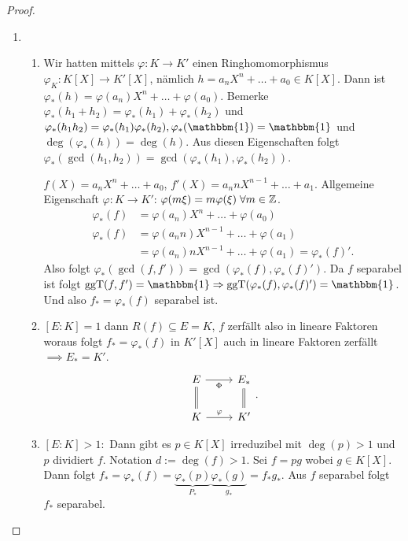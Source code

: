 \begin{proof}
	\begin{enumerate}
		\item \begin{enumerate}
			\item Wir hatten mittels $\varphi: K \to K'$ einen Ringhomomorphismus $\varphi_{K}: K[X] \to K'[X]$, nämlich
				$h = a_{n} X^{n} + \ldots + a_0 \in K[X]$.
				Dann ist $\varphi_{*}(h) = \varphi(a_{n}) X^{n} + \ldots + \varphi(a_0)$. Bemerke $\varphi_{*}(h_1 + h_2) = \varphi_{*}(h_1) + \varphi_{*}(h_2)$ und
				$\varphi_{*}(h_1 h_2) = \varphi_{*}(h_1)\varphi_{*}(h_2), \varphi_{*}(\mathbbm{1}) = \mathbbm{1}$ und $\deg(\varphi_{*}(h)) = \deg(h)$.
				Aus diesen Eigenschaften folgt $\varphi_{*}(\gcd(h_1, h_2)) = \gcd(\varphi_{*}(h_1), \varphi_{*}(h_2))$.

				$f(X) = a_{n} X^{n} + \ldots + a_0$, $f'(X) = a_{n} n X^{n-1} + \ldots + a_1$.
				Allgemeine Eigenschaft $\varphi: K \to K'$: $\varphi(m \xi) = m \varphi(\xi) \forall m \in \Z$.
				\begin{align*}
					\varphi_{*}(f) &= \varphi(a_{n}) X^{n} + \ldots + \varphi(a_0)\\
					\varphi_{*}(f) &= \varphi(a_{n} n) X^{n-1} + \ldots + \varphi(a_1)\\
								   &= \varphi(a_{n}) n X^{n-1} + \ldots + \varphi(a_1) = \varphi_{*}(f)'
				.\end{align*}
				Also folgt $\varphi_{*}(\gcd(f,f')) = \gcd(\varphi_{*}(f), \varphi_{*}(f)')$.
				Da $f$ separabel ist folgt $\gcd(f,f') = \mathbbm{1} \implies \gcd(\varphi_{*}(f), \varphi_{*}(f)') = \mathbbm{1}$.
				Und also $f_{*} = \varphi_{*}(f)$ separabel ist.
			\item $[E : K] = 1$ dann $R(f) \subseteq E = K$, $f$ zerfällt also in lineare Faktoren woraus folgt $f_{*} = \varphi_{*}(f)$ in $K'[X]$ auch in
				lineare Faktoren zerfällt $\implies E_{*} = K'$.
			\[
				\begin{tikzcd}
					E \arrow[r, "\Phi"']                               & E_*                               \\
					K \arrow[r, "\varphi"] \arrow[u, equal] & K' \arrow[u,equal]
				\end{tikzcd}
				.\] 	
			\item $[E : K] > 1:$ Dann gibt es $p \in K[X]$ irreduzibel mit $\deg(p) > 1$ und $p$ dividiert $f$. Notation $d := \deg(f) > 1$.
				Sei $f = p g$ wobei $g \in K[X]$. Dann folgt $f_{*} = \varphi_{*}(f) = \underbrace{\varphi_{*}(p)}_{P_{*}}\underbrace{\varphi_{*}(g)}_{g_{*}} = f_{*} g_{*}$.
				Aus $f$ separabel folgt $f_{*}$ separabel.


\end{enumerate}
\end{enumerate}
\end{proof}
